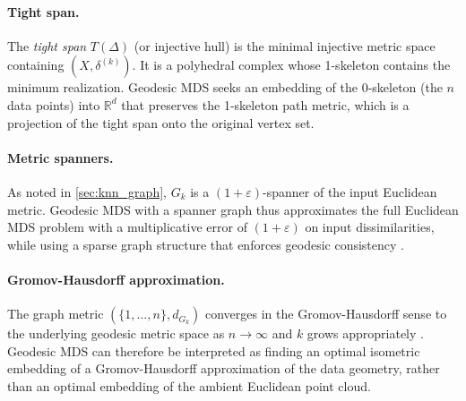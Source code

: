 \documentclass[twoside,11pt]{article}
\newcommand{\R}{\mathbb{R}}
\newcommand{\Gk}{G_k}
\begin{document}
\paragraph{Tight span.}
The \emph{tight span} $T(\Delta)$ (or injective hull)
\citep{dress1984trees, isbell1964six} is the minimal injective metric
space containing $(X, \delta^{(k)})$.  It is a polyhedral complex whose
1-skeleton contains the minimum realization.  Geodesic MDS seeks an
embedding of the 0-skeleton (the $n$ data points) into $\R^d$ that
preserves the 1-skeleton path metric, which is a projection of the
tight span onto the original vertex set.

\paragraph{Metric spanners.}
As noted in \cref{sec:knn_graph}, $\Gk$ is a $(1+\varepsilon)$-spanner
of the input Euclidean metric.  Geodesic MDS with a spanner graph thus
approximates the full Euclidean MDS problem with a multiplicative error
of $(1+\varepsilon)$ on input dissimilarities, while using a sparse graph
structure that enforces geodesic consistency \citep{althofer1993sparse}.

\paragraph{Gromov-Hausdorff approximation.}
The graph metric $(\{1,\ldots,n\}, d_{\Gk})$ converges in the
Gromov-Hausdorff sense to the underlying geodesic metric space as
$n \to \infty$ and $k$ grows appropriately
\citep{gromov1999metric, latschev2001riemannian, bernstein2000graph}.
Geodesic MDS can therefore be interpreted as finding an optimal isometric
embedding of a Gromov-Hausdorff approximation of the data geometry, rather
than an optimal embedding of the ambient Euclidean point cloud.




\end{document}
